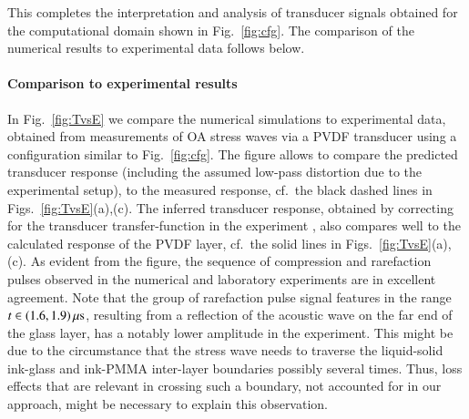 \documentclass[5p,times,twocolumn]{elsarticle}
\begin{document}
This completes the interpretation and analysis of transducer signals obtained
for the computational domain shown in Fig.\ \ref{fig:cfg}. The comparison of
the numerical results to experimental data follows below.

\paragraph{Comparison to experimental results}

In Fig.\ \ref{fig:TvsE} we compare the numerical simulations to experimental
data, obtained from measurements of OA stress waves via a PVDF transducer 
using a configuration similar to Fig.\ \ref{fig:cfg}. 
The figure allows to compare the predicted transducer response (including the
assumed low-pass distortion due to the experimental setup), to the measured
response, cf.\ the black dashed lines in Figs.\ \ref{fig:TvsE}(a),(c).  The
inferred transducer response, obtained by correcting for the transducer
transfer-function in the experiment \cite{Blumenroether:2017}, also compares
well to the calculated response of the PVDF layer, cf.\ the solid lines in
Figs.\ \ref{fig:TvsE}(a),(c).  As evident from the figure, the sequence of
compression and rarefaction pulses observed in the numerical and laboratory
experiments are in excellent agreement. 
Note that the group of rarefaction pulse signal features in the range $t \in
(1.6,1.9)\,{\rm{\mu s}}$, resulting from a reflection of the acoustic wave on
the far end of the glass layer, has a notably lower amplitude in the
experiment. This might be due to the circumstance that the stress wave needs to
traverse the liquid-solid ink-glass and ink-PMMA inter-layer boundaries
possibly several times. Thus, loss effects that are relevant in crossing such a
boundary, not accounted for in our approach, might be necessary to explain
this observation. 
\end{document}
